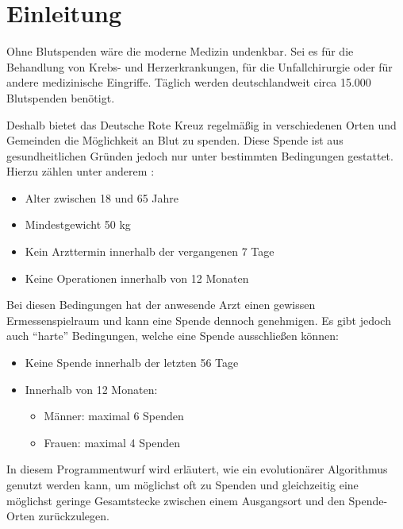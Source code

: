 \section{Einleitung}\label{sec:einleitung}
Ohne Blutspenden wäre die moderne Medizin undenkbar.
Sei es für die Behandlung von Krebs- und Herzerkrankungen,
für die Unfallchirurgie oder für andere medizinische Eingriffe.
Täglich werden deutschlandweit circa 15.000 Blutspenden benötigt. \cite{FragenAn98:online}

Deshalb bietet das Deutsche Rote Kreuz regelmäßig in verschiedenen Orten und Gemeinden die Möglichkeit an Blut zu spenden.
Diese Spende ist aus gesundheitlichen Gründen jedoch nur unter bestimmten Bedingungen gestattet.
Hierzu zählen unter anderem \cite{SpendeCh65:online}:
\begin{itemize}
    \setlength\itemsep{-0.5em}
    \item Alter zwischen 18 und 65 Jahre
    \item Mindestgewicht 50 kg
    \item Kein Arzttermin innerhalb der vergangenen 7 Tage
    \item Keine Operationen innerhalb von 12 Monaten
\end{itemize}

Bei diesen Bedingungen hat der anwesende Arzt einen gewissen Ermessenspielraum und kann eine Spende dennoch genehmigen.
Es gibt jedoch auch \enquote{harte} Bedingungen, welche eine Spende ausschließen können:

\begin{itemize}
    \setlength\itemsep{-0.5em}
    \item Keine Spende innerhalb der letzten 56 Tage
    \item Innerhalb von 12 Monaten: \begin{itemize}
        \vspace{-1em}
        \setlength\itemsep{-0.5em}
        \item Männer:  maximal 6 Spenden
        \item Frauen:  maximal 4 Spenden
    \end{itemize}
\end{itemize}

In diesem Programmentwurf wird erläutert,
wie ein evolutionärer Algorithmus genutzt werden kann,
um möglichst oft zu Spenden und
gleichzeitig eine möglichst geringe Gesamtstecke zwischen einem Ausgangsort und den Spende-Orten zurückzulegen.
